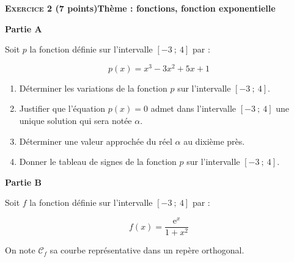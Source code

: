 \documentclass[10pt,a4paper]{article}
\begin{document}
\bigskip

\textbf{\textsc{Exercice 2} \quad (7 points)\hfill Thème : fonctions, fonction exponentielle}

\bigskip

\textbf{Partie A}

\medskip 

Soit $p$ la fonction définie sur l'intervalle $[-3~;~4]$ par :

\[p(x) = x^3 - 3x^2 + 5x + 1\]

\begin{enumerate}
\item Déterminer les variations de la fonction $p$ sur l'intervalle $[-3~;~4]$.
\item Justifier que l'équation $p(x) = 0$ admet dans l'intervalle $[-3~;~4]$ une unique solution qui sera notée $\alpha$.
\item Déterminer une valeur approchée du réel $\alpha$ au dixième près.
\item Donner le tableau de signes de la fonction $p$ sur l'intervalle $[-3~;~4]$.
\end{enumerate}

\bigskip

\textbf{Partie B}

\medskip 

Soit $f$ la fonction définie sur l'intervalle $[-3~;~4]$ par :

\[f(x) = \dfrac{\text{e}^x}{1 + x^2}\]

On note $\mathcal{C}_f$ sa courbe représentative dans un repère orthogonal.

\medskip
\end{document}
